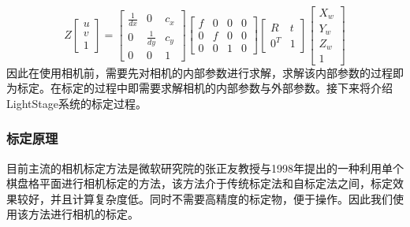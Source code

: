 \begin{equation}
    Z\left[\begin{array}{c}u\\v\\1\end{array}\right] =
    \left[\begin{array}{ccc}\frac{1}{dx}&0&c_x\\0&\frac{1}{dy}&c_y\\0&0&1\end{array}\right]
    \left[\begin{array}{cccc}f&0&0&0\\0&f&0&0\\0&0&1&0\end{array}\right]
    \left[\begin{array}{cc}R&t\\0^T&1\end{array}\right]
    \left[\begin{array}{c}X_w\\Y_w\\Z_w\\1\end{array}\right]
\end{equation}
因此在使用相机前，需要先对相机的内部参数进行求解，求解该内部参数的过程即为标定。在标定的过程中即需要求解相机的内部参数与外部参数。接下来将介绍LightStage系统的标定过程。

\subsubsection{标定原理}

目前主流的相机标定方法是微软研究院的张正友教授与1998年提出的一种利用单个棋盘格平面进行相机标定的方法\cite{zhangzhengyou}，该方法介于传统标定法和自标定法之间，标定效果较好，并且计算复杂度低。同时不需要高精度的标定物，便于操作。因此我们使用该方法进行相机的标定。

